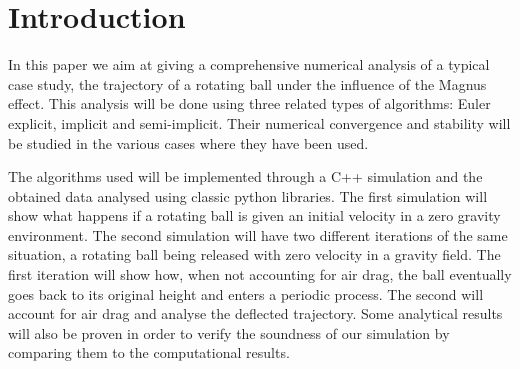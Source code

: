 \section{Introduction}

In this paper we aim at giving a comprehensive numerical analysis of a typical case study, the trajectory of a rotating ball under the influence of the Magnus effect. This analysis will be done using three related types of algorithms: Euler explicit, implicit and semi-implicit. Their numerical convergence and stability will be studied in the various cases where they have been used.

The algorithms used will be implemented through a C++ simulation and the obtained data analysed using classic python libraries. The first simulation will show what happens if a rotating ball is given an initial velocity in a zero gravity environment. The second simulation will have two different iterations of the same situation, a rotating ball being released with zero velocity in a gravity field. The first iteration will show how, when not accounting for air drag, the ball eventually goes back to its original height and enters a periodic process. The second will account for air drag and analyse the deflected trajectory. Some analytical results will also be proven in order to verify the soundness of our simulation by comparing them to the computational results.

